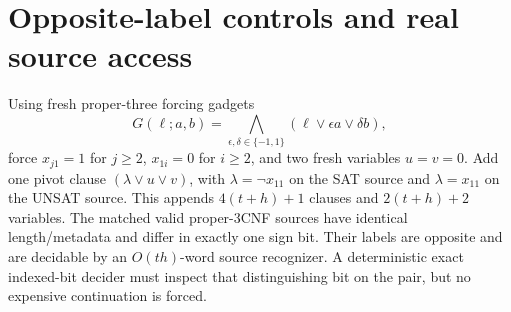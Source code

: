 \documentclass[11pt]{article}
\begin{document}
\section{Opposite-label controls and real source access}
Using fresh proper-three forcing gadgets
\[
G(\ell;a,b)=\bigwedge_{\epsilon,\delta\in\{-1,1\}}
(\ell\vee\epsilon a\vee\delta b),
\]
force $x_{j1}=1$ for $j\ge2$, $x_{1i}=0$ for $i\ge2$, and two fresh variables $u=v=0$. Add one pivot clause $(\lambda\vee u\vee v)$, with $\lambda=\neg x_{11}$ on the SAT source and $\lambda=x_{11}$ on the UNSAT source. This appends $4(t+h)+1$ clauses and $2(t+h)+2$ variables. The matched valid proper-3CNF sources have identical length/metadata and differ in exactly one sign bit. Their labels are opposite and are decidable by an $O(th)$-word source recognizer. A deterministic exact indexed-bit decider must inspect that distinguishing bit on the pair, but no expensive continuation is forced.
\end{document}

